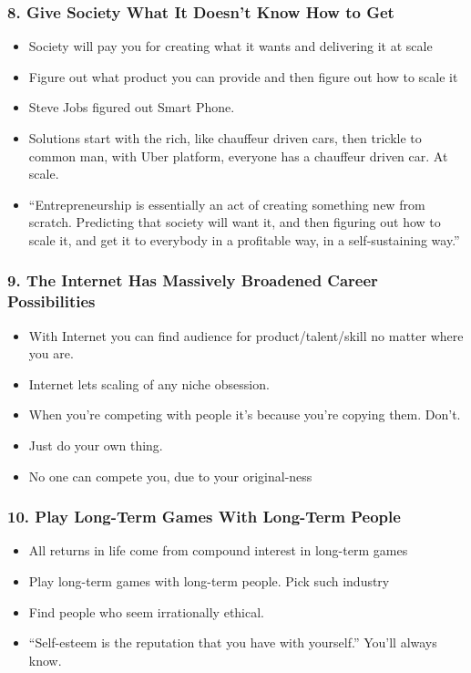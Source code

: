 \begin{frame}[fragile]
\frametitle{8. Give Society What It Doesn't Know How to Get}
\begin{itemize}
\item Society will pay you for creating what it wants and delivering it at scale
\item Figure out what product you can provide and then figure out how to scale it
\item Steve Jobs figured out Smart Phone.
\item Solutions start with the rich, like chauffeur driven cars, then trickle to common man, with Uber platform, everyone has a chauffeur driven car. At scale.
\item ``Entrepreneurship is essentially an act of creating something new from scratch. Predicting that society will want it, and then figuring out how to scale it, and get it to everybody in a profitable way, in a self-sustaining way.''
\end{itemize}
\end{frame}

\begin{frame}[fragile]
\frametitle{9. The Internet Has Massively Broadened Career Possibilities}
\begin{itemize}
\item With Internet you can find audience for product/talent/skill no matter where you are.
\item Internet lets scaling of any niche obsession.
\item When you're competing with people it's because you're copying them. Don't.  
\item Just do your own thing.
\item No one can compete you, due to your original-ness
\end{itemize}
\end{frame}


\begin{frame}[fragile]
\frametitle{10. Play Long-Term Games With Long-Term People}
\begin{itemize}
\item All returns in life come from compound interest in long-term games
\item Play long-term games with long-term people. Pick such industry
\item Find people who seem irrationally ethical.
\item ``Self-esteem is the reputation that you have with yourself.'' You'll always know.
\end{itemize}
\end{frame}

